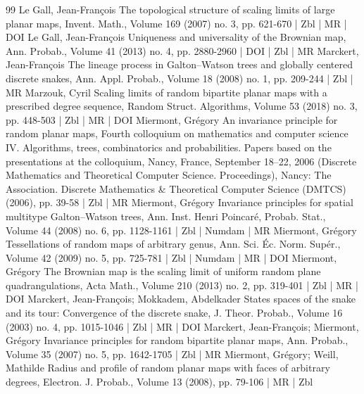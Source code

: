 \documentclass[10pt]{amsart}
\theoremstyle{definition}\newtheorem{defi}[theo]{Definition}\newtheorem{rema}[theo]{Remark}\newtheorem{exam}[theo]{Example}\newtheorem{exem}[theo]{Example}\newtheorem{nota}[theo]{Notation}
\begin{document}
\begin{thebibliography}{99}
Le Gall, Jean-François The topological structure of scaling limits of large planar maps, Invent. Math., Volume 169 (2007) no. 3, pp. 621-670 | Zbl | MR | DOI
Le Gall, Jean-François Uniqueness and universality of the Brownian map, Ann. Probab., Volume 41 (2013) no. 4, pp. 2880-2960 | DOI | Zbl | MR
Marckert, Jean-François The lineage process in Galton–Watson trees and globally centered discrete snakes, Ann. Appl. Probab., Volume 18 (2008) no. 1, pp. 209-244 | Zbl | MR
Marzouk, Cyril Scaling limits of random bipartite planar maps with a prescribed degree sequence, Random Struct. Algorithms, Volume 53 (2018) no. 3, pp. 448-503 | Zbl | MR | DOI
Miermont, Grégory An invariance principle for random planar maps, Fourth colloquium on mathematics and computer science IV. Algorithms, trees, combinatorics and probabilities. Papers based on the presentations at the colloquium, Nancy, France, September 18–22, 2006 (Discrete Mathematics and Theoretical Computer Science. Proceedings), Nancy: The Association. Discrete Mathematics \& Theoretical Computer Science (DMTCS) (2006), pp. 39-58 | Zbl | MR
Miermont, Grégory Invariance principles for spatial multitype Galton–Watson trees, Ann. Inst. Henri Poincaré, Probab. Stat., Volume 44 (2008) no. 6, pp. 1128-1161 | Zbl | Numdam | MR
Miermont, Grégory Tessellations of random maps of arbitrary genus, Ann. Sci. Éc. Norm. Supér., Volume 42 (2009) no. 5, pp. 725-781 | Zbl | Numdam | MR | DOI
Miermont, Grégory The Brownian map is the scaling limit of uniform random plane quadrangulations, Acta Math., Volume 210 (2013) no. 2, pp. 319-401 | Zbl | MR | DOI
Marckert, Jean-François; Mokkadem, Abdelkader States spaces of the snake and its tour: Convergence of the discrete snake, J. Theor. Probab., Volume 16 (2003) no. 4, pp. 1015-1046 | Zbl | MR | DOI
Marckert, Jean-François; Miermont, Grégory Invariance principles for random bipartite planar maps, Ann. Probab., Volume 35 (2007) no. 5, pp. 1642-1705 | Zbl | MR
Miermont, Grégory; Weill, Mathilde Radius and profile of random planar maps with faces of arbitrary degrees, Electron. J. Probab., Volume 13 (2008), pp. 79-106 | MR | Zbl
\end{thebibliography}
\end{document}
